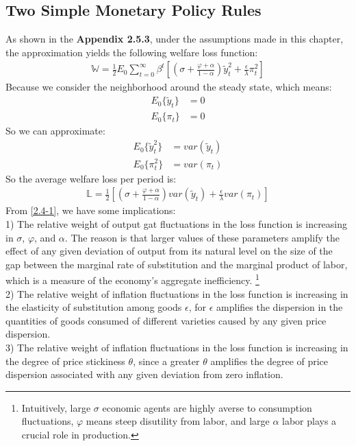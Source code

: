\documentclass{article}
\numberwithin{equation}{section}
\begin{document}
\subsection{Two Simple Monetary Policy Rules}
As shown in the \textbf{Appendix 2.5.3}, under the assumptions made in this chapter, the approximation yields the following welfare loss function:
	\begin{align*}
		\mathbb{W} = \frac{1}{2} E_0 \sum\limits^\infty_{t=0} \beta^t \left[ \left( \sigma + \frac{\varphi + \alpha}{1 - \alpha} \right)\tilde{y}^2_t + \frac{\epsilon}{\lambda}\pi^2_t \right]
	\end{align*}
Because we consider the neighborhood around the steady state, which means:
	\begin{align*}
		E_0\{ \tilde{y}_t \} &= 0\\
		E_0\{ \pi_t \} &= 0
	\end{align*}
So we can approximate:
	\begin{align*}
		E_0\{ \tilde{y}^2_t \} &= var \left( \tilde{y}_t \right)\\
		E_0\{ \pi^2_t \} &= var \left( \pi_t \right)
	\end{align*}
So the average welfare loss per period is:
	\begin{align}
		\mathbb{L} = \frac{1}{2} \left[ \left( \sigma + \frac{\varphi + \alpha}{1 - \alpha} \right) var \left( \tilde{y}_t \right) + \frac{\epsilon}{\lambda} var \left( \pi_t \right) \right] \label{2.4-1}
	\end{align}
From \eqref{2.4-1}, we have some implications:\\
1) The relative weight of output gat fluctuations in the loss function is increasing in $\sigma$, $\varphi$, and $\alpha$. The reason is that larger values of these parameters amplify the effect of any given deviation of output from its natural level on the size of the gap between the marginal rate of substitution and the marginal product of labor, which is a measure of the economy's aggregate inefficiency.
\footnote{Intuitively, large $\sigma$ economic agents are highly averse to consumption fluctuations, $\varphi$ means steep disutility from labor, and large $\alpha$ labor plays a crucial role in production.}\\
2) The relative weight of inflation fluctuations in the loss function is increasing in the elasticity of substitution among goods $\epsilon$, for $\epsilon$ amplifies the dispersion in the quantities of goods  consumed of different varieties caused by any given price dispersion.\\
3) The relative weight of inflation fluctuations in the loss function is increasing in the degree of price stickiness $\theta$, since a greater $\theta$ amplifies the degree of price dispersion associated with any given deviation from zero inflation.
\end{document}
